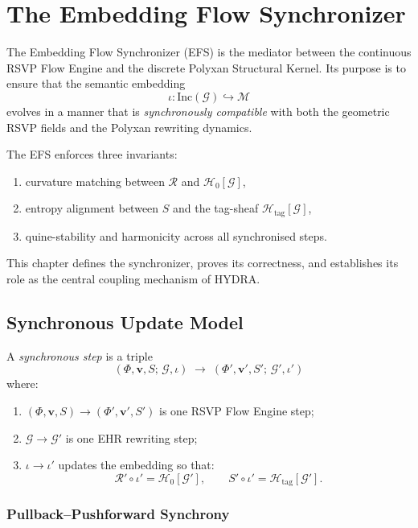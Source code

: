 \chapter{The Embedding Flow Synchronizer}
\label{ch:76}

The Embedding Flow Synchronizer (EFS) is the mediator between the continuous
RSVP Flow Engine and the discrete Polyxan Structural Kernel.  
Its purpose is to ensure that the semantic embedding
\[
\iota : \mathrm{Inc}(\mathcal{G}) \hookrightarrow \mathcal{M}
\]
evolves in a manner that is \emph{synchronously compatible}
with both the geometric RSVP fields and the Polyxan rewriting dynamics.

The EFS enforces three invariants:
\begin{enumerate}
\item curvature matching between $\mathcal{R}$ and $\mathcal{H}_0[\mathcal{G}]$,
\item entropy alignment between $S$ and the tag-sheaf $\mathcal{H}_{\mathrm{tag}}[\mathcal{G}]$,
\item quine-stability and harmonicity across all synchronised steps.
\end{enumerate}

This chapter defines the synchronizer, proves its correctness, and establishes
its role as the central coupling mechanism of HYDRA.

\section{Synchronous Update Model}

A \emph{synchronous step} is a triple
\[
(\Phi,\mathbf{v},S;\,\mathcal{G},\iota)
  \;\longrightarrow\;
(\Phi',\mathbf{v}',S';\,\mathcal{G}',\iota')
\]
where:
\begin{enumerate}
\item $(\Phi,\mathbf{v},S) \to (\Phi',\mathbf{v}',S')$  
      is one RSVP Flow Engine step;
\item $\mathcal{G} \to \mathcal{G}'$  
      is one EHR rewriting step;
\item $\iota \to \iota'$  
      updates the embedding so that:
      \[
      \mathcal{R}'\circ\iota' = \mathcal{H}_0[\mathcal{G}'],
      \qquad
      S'\circ\iota' = \mathcal{H}_{\mathrm{tag}}[\mathcal{G}'].
      \]
\end{enumerate}

\subsection{Pullback–Pushforward Synchrony}

